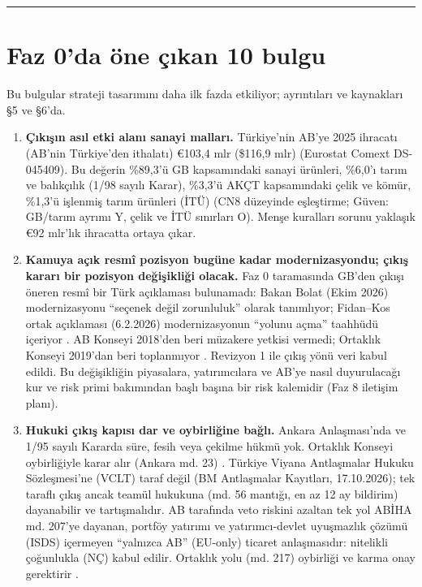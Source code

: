 \endgroup

\begin{center}\rule{0.5\linewidth}{0.5pt}\end{center}

\hypertarget{00_plan-faz-0da-uxf6ne-uxe7ux131kan-10-bulgu}{%
\section{Faz 0'da öne çıkan 10 bulgu}\label{00_plan-faz-0da-uxf6ne-uxe7ux131kan-10-bulgu}}

Bu bulgular strateji tasarımını daha ilk fazda etkiliyor; ayrıntıları ve kaynakları §5 ve §6'da.

\begin{enumerate}
\def\labelenumi{\arabic{enumi}.}
\tightlist
\item
  \textbf{Çıkışın asıl etki alanı sanayi malları.} Türkiye'nin AB'ye 2025 ihracatı (AB'nin Türkiye'den ithalatı) €103,4 mlr (\$116,9 mlr) \etiketV{} (Eurostat Comext DS-045409). Bu değerin \%89,3'ü GB kapsamındaki sanayi ürünleri, \%6,0'ı tarım ve balıkçılık (1/98 sayılı Karar), \%3,3'ü AKÇT kapsamındaki çelik ve kömür, \%1,3'ü işlenmiş tarım ürünleri (İTÜ) \etiketV{} (CN8 düzeyinde eşleştirme; Güven: GB/tarım ayrımı Y, çelik ve İTÜ sınırları O). Menşe kuralları sorunu yaklaşık €92 mlr'lık ihracatta ortaya çıkar.
\item
  \textbf{Kamuya açık resmî pozisyon bugüne kadar modernizasyondu; çıkış kararı bir pozisyon değişikliği olacak.} Faz 0 taramasında GB'den çıkışı öneren resmî bir Türk açıklaması bulunamadı: Bakan Bolat (Ekim 2026) modernizasyonu ``seçenek değil zorunluluk'' olarak tanımlıyor; Fidan--Kos ortak açıklaması (6.2.2026) modernizasyonun ``yolunu açma'' taahhüdü içeriyor \etiketV{}. AB Konseyi 2018'den beri müzakere yetkisi vermedi; Ortaklık Konseyi 2019'dan beri toplanmıyor \etiketV{}. Revizyon 1 ile çıkış yönü veri kabul edildi. Bu değişikliğin piyasalara, yatırımcılara ve AB'ye nasıl duyurulacağı kur ve risk primi bakımından başlı başına bir risk kalemidir (Faz 8 iletişim planı).
\item
  \textbf{Hukuki çıkış kapısı dar ve oybirliğine bağlı.} Ankara Anlaşması'nda ve 1/95 sayılı Kararda süre, fesih veya çekilme hükmü yok. Ortaklık Konseyi oybirliğiyle karar alır (Ankara md. 23) \etiketV{}. Türkiye Viyana Antlaşmalar Hukuku Sözleşmesi'ne (VCLT) taraf değil \etiketV{} (BM Antlaşmalar Kayıtları, 17.10.2026); tek taraflı çıkış ancak teamül hukukuna (md. 56 mantığı, en az 12 ay bildirim) dayanabilir ve tartışmalıdır. AB tarafında veto riskini azaltan tek yol ABİHA md. 207'ye dayanan, portföy yatırımı ve yatırımcı-devlet uyuşmazlık çözümü (ISDS) içermeyen ``yalnızca AB'' (EU-only) ticaret anlaşmasıdır: nitelikli çoğunlukla (NÇ) kabul edilir. Ortaklık yolu (md. 217) oybirliği ve karma onay gerektirir \etiketV{}.

\end{enumerate}
